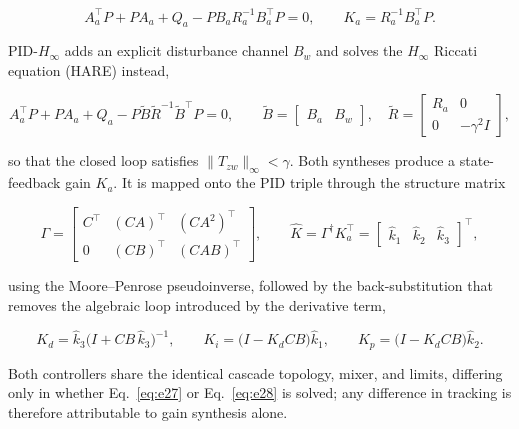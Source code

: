 \documentclass[10pt,letterpaper]{article}
\newcommand{\cit}[1]{\cite{#1}}
\begin{document}
\begin{equation}
    \label{eq:e27}
    A_a^{\!\top}P+PA_a+Q_a-PB_aR_a^{-1}B_a^{\!\top}P=0,
    \qquad K_a=R_a^{-1}B_a^{\!\top}P .
\end{equation}

PID-$H_\infty$ adds an explicit disturbance channel $B_w$ and solves the $H_\infty$ Riccati
equation (HARE) \cit{doyleStateSpaceHinf1989} instead,

\begin{equation}
    \label{eq:e28}
    A_a^{\!\top}P+PA_a+Q_a-P\tilde B\tilde R^{-1}\tilde B^{\!\top}P=0,
    \qquad
    \tilde B=\begin{bmatrix}B_a&B_w\end{bmatrix},\quad
    \tilde R=\begin{bmatrix}R_a&0\\0&-\gamma^2 I\end{bmatrix},
\end{equation}

so that the closed loop satisfies $\|T_{zw}\|_\infty<\gamma$. Both syntheses produce a state-feedback gain $K_a$. It is mapped onto the PID triple
through the structure matrix

\begin{equation}
    \label{eq:e29}
    \Gamma=\begin{bmatrix}
        C^{\!\top} & (CA)^{\!\top} & (CA^2)^{\!\top} \\[2pt]
        0          & (CB)^{\!\top} & (CAB)^{\!\top}
    \end{bmatrix},
    \qquad
    \hat K=\Gamma^{\dagger}K_a^{\!\top}
    =\begin{bmatrix}\hat k_1&\hat k_2&\hat k_3\end{bmatrix}^{\!\top},
\end{equation}

using the Moore--Penrose pseudoinverse, followed by the back-substitution that removes the
algebraic loop introduced by the derivative term,

\begin{equation}
    \label{eq:e30}
    K_d=\hat k_3\bigl(I+CB\,\hat k_3\bigr)^{-1},
    \qquad
    K_i=\bigl(I-K_dCB\bigr)\hat k_1,
    \qquad
    K_p=\bigl(I-K_dCB\bigr)\hat k_2 .
\end{equation}

Both controllers share the identical cascade topology, mixer, and limits, differing only in
whether Eq.~\eqref{eq:e27} or Eq.~\eqref{eq:e28} is solved; any difference in tracking is therefore attributable to gain
synthesis alone.
\end{document}
